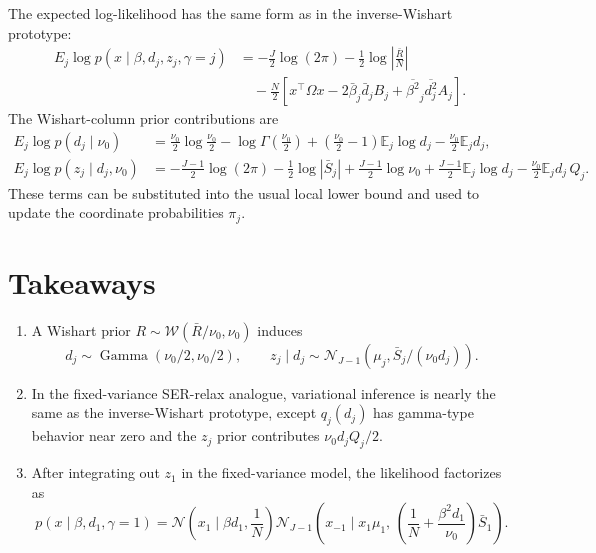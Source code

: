 \documentclass[11pt]{article}
\newcommand{\Rbar}{\bar R}
\newcommand{\Sbar}{\bar S}
\newcommand{\E}{\mathbb E}
\newcommand{\Gam}{\operatorname{Gamma}}
\newcommand{\Wishart}{\mathcal W}
\newcommand{\Normal}{\mathcal N}
\begin{document}
The expected log-likelihood has the same form as in the inverse-Wishart
prototype:
\begin{align}
E_j\log p(x\mid \beta,d_j,z_j,\gamma=j)
&=
-\frac{J}{2}\log(2\pi)
-\frac12\log\left|\frac{\Rbar}{N}\right| \nonumber\\
&\quad
-\frac{N}{2}
\left[
x^\top\Omega x
-2\bar\beta_j\bar d_jB_j
+\overline{\beta^2}_j\overline{d_j^2}A_j
\right].
\end{align}
The Wishart-column prior contributions are
\begin{align}
E_j\log p(d_j\mid\nu_0)
&=
\frac{\nu_0}{2}\log\frac{\nu_0}{2}
-\log\Gamma\left(\frac{\nu_0}{2}\right)
+\left(\frac{\nu_0}{2}-1\right)\E_j\log d_j
-\frac{\nu_0}{2}\E_j d_j,\\
E_j\log p(z_j\mid d_j,\nu_0)
&=
-\frac{J-1}{2}\log(2\pi)
-\frac12\log|\Sbar_j|
+\frac{J-1}{2}\log\nu_0
+\frac{J-1}{2}\E_j\log d_j
-\frac{\nu_0}{2}\E_jd_j\,Q_j.
\end{align}
These terms can be substituted into the usual local lower bound and used
to update the coordinate probabilities \(\pi_j\).

\section{Takeaways}

\begin{enumerate}[leftmargin=*]
\item A Wishart prior \(R\sim\Wishart(\Rbar/\nu_0,\nu_0)\) induces
\[
d_j\sim\Gam(\nu_0/2,\nu_0/2),\qquad
z_j\mid d_j\sim
\Normal_{J-1}(\mu_j,\Sbar_j/(\nu_0d_j)).
\]
\item In the fixed-variance SER-relax analogue, variational inference is
nearly the same as the inverse-Wishart prototype, except \(q_j(d_j)\)
has gamma-type behavior near zero and the \(z_j\) prior contributes
\(\nu_0 d_j Q_j/2\).
\item After integrating out \(z_1\) in the fixed-variance model, the
likelihood factorizes as
\[
p(x\mid \beta,d_1,\gamma=1)
=
\Normal\left(x_1\mid \beta d_1,\frac{1}{N}\right)
\Normal_{J-1}\left(
x_{-1}\mid x_1\mu_1,\,
\left(\frac{1}{N}+\frac{\beta^2d_1}{\nu_0}\right)\Sbar_1
\right).
\]
\end{enumerate}
\end{document}
